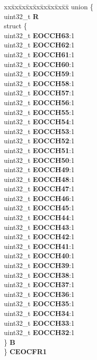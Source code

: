 \begin{DoxyCompactItemize}
\begin{tabbing}
\end{tabbing}\item 
\mbox{\label{structADC__tag_aa478923f6863e27af3c6c70d0d175ffc}} 
\begin{tabbing}
xx\=xx\=xx\=xx\=xx\=xx\=xx\=xx\=xx\=\kill
union \{\\
\>uint32\_t {\bfseries R}\\
\>struct \{\\
\>\>uint32\_t {\bfseries EOCCH63}:1\\
\>\>uint32\_t {\bfseries EOCCH62}:1\\
\>\>uint32\_t {\bfseries EOCCH61}:1\\
\>\>uint32\_t {\bfseries EOCCH60}:1\\
\>\>uint32\_t {\bfseries EOCCH59}:1\\
\>\>uint32\_t {\bfseries EOCCH58}:1\\
\>\>uint32\_t {\bfseries EOCCH57}:1\\
\>\>uint32\_t {\bfseries EOCCH56}:1\\
\>\>uint32\_t {\bfseries EOCCH55}:1\\
\>\>uint32\_t {\bfseries EOCCH54}:1\\
\>\>uint32\_t {\bfseries EOCCH53}:1\\
\>\>uint32\_t {\bfseries EOCCH52}:1\\
\>\>uint32\_t {\bfseries EOCCH51}:1\\
\>\>uint32\_t {\bfseries EOCCH50}:1\\
\>\>uint32\_t {\bfseries EOCCH49}:1\\
\>\>uint32\_t {\bfseries EOCCH48}:1\\
\>\>uint32\_t {\bfseries EOCCH47}:1\\
\>\>uint32\_t {\bfseries EOCCH46}:1\\
\>\>uint32\_t {\bfseries EOCCH45}:1\\
\>\>uint32\_t {\bfseries EOCCH44}:1\\
\>\>uint32\_t {\bfseries EOCCH43}:1\\
\>\>uint32\_t {\bfseries EOCCH42}:1\\
\>\>uint32\_t {\bfseries EOCCH41}:1\\
\>\>uint32\_t {\bfseries EOCCH40}:1\\
\>\>uint32\_t {\bfseries EOCCH39}:1\\
\>\>uint32\_t {\bfseries EOCCH38}:1\\
\>\>uint32\_t {\bfseries EOCCH37}:1\\
\>\>uint32\_t {\bfseries EOCCH36}:1\\
\>\>uint32\_t {\bfseries EOCCH35}:1\\
\>\>uint32\_t {\bfseries EOCCH34}:1\\
\>\>uint32\_t {\bfseries EOCCH33}:1\\
\>\>uint32\_t {\bfseries EOCCH32}:1\\
\>\} {\bfseries B}\\
\} {\bfseries CEOCFR1}\\


\end{tabbing}
\end{DoxyCompactItemize}
